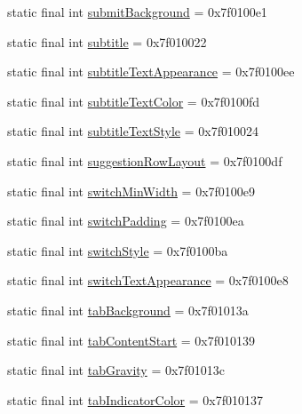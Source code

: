 \begin{CompactItemize}
\item 
static final int \hyperlink{classandroid_1_1support_1_1v7_1_1appcompat_1_1_r_1_1attr_3ab4bf5515b683e43ab549908b53f91d}{submitBackground} = 0x7f0100e1
\item 
static final int \hyperlink{classandroid_1_1support_1_1v7_1_1appcompat_1_1_r_1_1attr_89bea78297464a7e9eb8df2238d6dde3}{subtitle} = 0x7f010022
\item 
static final int \hyperlink{classandroid_1_1support_1_1v7_1_1appcompat_1_1_r_1_1attr_1c59f17f993d7d052a999ef2dc8d5e2b}{subtitleTextAppearance} = 0x7f0100ee
\item 
static final int \hyperlink{classandroid_1_1support_1_1v7_1_1appcompat_1_1_r_1_1attr_74351340f58b8c9eb971541b58952925}{subtitleTextColor} = 0x7f0100fd
\item 
static final int \hyperlink{classandroid_1_1support_1_1v7_1_1appcompat_1_1_r_1_1attr_3c014ba5d5b04ee8b7427073ad5bb7a5}{subtitleTextStyle} = 0x7f010024
\item 
static final int \hyperlink{classandroid_1_1support_1_1v7_1_1appcompat_1_1_r_1_1attr_0ff0f12ae8b6b4d9a0b895c3b6b870ef}{suggestionRowLayout} = 0x7f0100df
\item 
static final int \hyperlink{classandroid_1_1support_1_1v7_1_1appcompat_1_1_r_1_1attr_2bccda1a3a53f6525ebc02488f61d536}{switchMinWidth} = 0x7f0100e9
\item 
static final int \hyperlink{classandroid_1_1support_1_1v7_1_1appcompat_1_1_r_1_1attr_8772eabebe00ab97e2b738e60f5d2388}{switchPadding} = 0x7f0100ea
\item 
static final int \hyperlink{classandroid_1_1support_1_1v7_1_1appcompat_1_1_r_1_1attr_5544332f304b9b252067b01c02c87558}{switchStyle} = 0x7f0100ba
\item 
static final int \hyperlink{classandroid_1_1support_1_1v7_1_1appcompat_1_1_r_1_1attr_13517aa6c71334e82faefaffd63b21d7}{switchTextAppearance} = 0x7f0100e8
\item 
static final int \hyperlink{classandroid_1_1support_1_1v7_1_1appcompat_1_1_r_1_1attr_08590d533fc05b4fdeab7efb3f739348}{tabBackground} = 0x7f01013a
\item 
static final int \hyperlink{classandroid_1_1support_1_1v7_1_1appcompat_1_1_r_1_1attr_0e188179228bab1a024560398fbda3d1}{tabContentStart} = 0x7f010139
\item 
static final int \hyperlink{classandroid_1_1support_1_1v7_1_1appcompat_1_1_r_1_1attr_6ee656564ae6799b32a2320a4c7af5c9}{tabGravity} = 0x7f01013c
\item 
static final int \hyperlink{classandroid_1_1support_1_1v7_1_1appcompat_1_1_r_1_1attr_81fd5f7612491d44b4a6a9cde0ed59e8}{tabIndicatorColor} = 0x7f010137

\end{CompactItemize}
